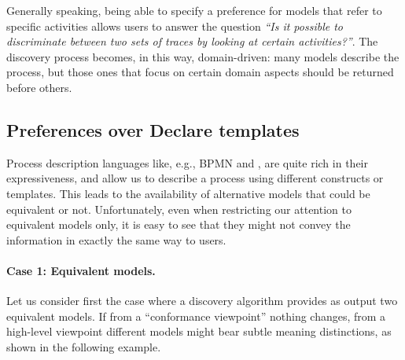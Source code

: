 Generally speaking, being able to specify a preference for models that refer to specific activities allows  users to answer the question \emph{``Is it possible to discriminate between two sets of traces by looking at certain activities?''}. The discovery process becomes, in this way, domain-driven: many models describe the process, but those ones that focus on certain domain aspects should be returned before others. %




\subsection{Preferences over Declare templates}
\label{subsec:prefOverTemplates}

Process description languages like, e.g., BPMN and \declare, are quite rich in their expressiveness, and allow us to describe a process using different constructs or templates. This leads to the availability of alternative models that could be equivalent or not. Unfortunately, even when restricting our attention to equivalent models only, it is easy to see that they might not convey the information in exactly the same way to users.


\paragraph{Case 1: Equivalent models.} Let us consider first the %
 case where a discovery algorithm provides as %
 output two equivalent models. If from a ``conformance viewpoint'' nothing changes, from a high-level viewpoint different models might bear subtle meaning distinctions, as shown in the following example.

